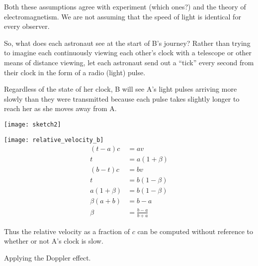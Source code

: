 \documentclass[a4paper]{report}
\begin{document}
Both these assumptions agree with experiment (which ones?) and the theory of electromagnetism. We are not assuming that the speed of light is identical for every observer.



So, what does each astronaut see at the start of B's journey? Rather than trying to imagine each continuously viewing each other's clock with a telescope or other means of distance viewing, let each astronaut send out a ``tick'' every second from their clock in the form of a radio (light) pulse.

Regardless of the state of her clock, B will see A's light pulses arriving more slowly than they were transmitted because each pulse takes slightly longer to reach her as she moves away from A.

\texttt{[image: sketch2]}


\texttt{[image: relative\_velocity\_b]}
\begin{align*}
  (t - a) c & =  av \\
  t & = a(1 + \beta) \\
(b - t)c & =  bv \\
t & = b(1 - \beta) \\
a(1 + \beta) & = b(1 - \beta) \\
\beta(a + b) & = b - a \\
\beta & = \frac{b - a}{b + a} 
\end{align*}

Thus the relative velocity as a fraction of $c$ can be computed without reference to whether or not A's clock is slow.


Applying the Doppler effect.

\end{document}

